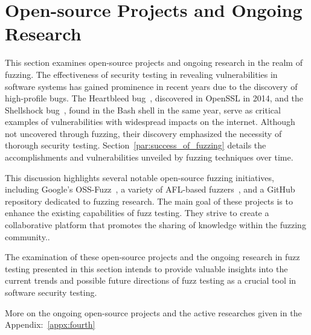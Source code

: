 \section{Open-source Projects and Ongoing Research} This section examines
open-source projects and ongoing research in the realm of fuzzing. The
effectiveness of security testing in revealing vulnerabilities in software
systems has gained prominence in recent years due to the discovery of
high-profile bugs. The Heartbleed bug~\cite{Heartble53:online}, discovered in
OpenSSL in 2014, and the Shellshock bug~\cite{shetty2018shellshock}, found in the
Bash shell in the same year, serve as critical examples of vulnerabilities with
widespread impacts on the internet. Although not uncovered through fuzzing,
their discovery emphasized the necessity of thorough security testing.
Section~\ref{par:success_of_fuzzing} details the accomplishments and
vulnerabilities unveiled by fuzzing techniques over time.

This discussion highlights several notable open-source fuzzing initiatives,
including Google's OSS-Fuzz~\cite{GitHubgo49:online}, a variety of AFL-based
fuzzers~\cite{257204}, and a GitHub repository dedicated to fuzzing research.
The main goal of these projects is to enhance the existing capabilities of fuzz
testing. They strive to create a collaborative platform that promotes the
sharing of knowledge within the fuzzing community..

The examination of these open-source projects and the ongoing research in fuzz
testing presented in this section intends to provide valuable insights into the
current trends and possible future directions of fuzz testing as a crucial tool
in software security testing.

More on the ongoing open-source projects and the active researches given in
the Appendix:~\ref{appx:fourth}
\clearpage